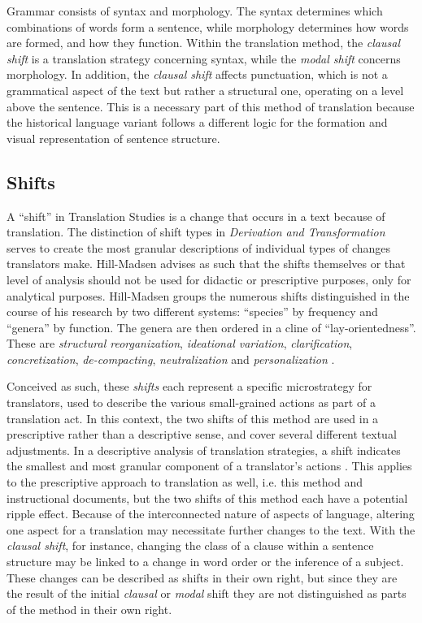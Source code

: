 \begin{paper}
Grammar consists of syntax and morphology. The syntax determines which
combinations of words form a sentence, while morphology determines how
words are formed, and how they function. Within the translation method,
the \emph{clausal shift} is a translation strategy concerning syntax,
while the \emph{modal shift} concerns morphology. In addition, the
\emph{clausal shift} affects punctuation, which is not a grammatical
aspect of the text but rather a structural one, operating on a level
above the sentence. This is a necessary part of this method of
translation because the historical language variant follows a different
logic for the formation and visual representation of sentence structure.

\subsection{Shifts}

A ``shift'' in Translation Studies is a change that occurs in a text
because of translation. The distinction of shift types in \emph{Derivation
and Transformation} serves to create the most granular descriptions of
individual types of changes translators make. Hill-Madsen advises as
such that the shifts themselves or that level of analysis should not be
used for didactic or prescriptive purposes, only for analytical
purposes. Hill-Madsen groups the numerous shifts distinguished in the
course of his research by two different systems: ``species'' by frequency
and ``genera'' by function. The genera are then ordered in a cline of
``lay-orientedness''. These are \emph{structural reorganization},
\emph{ideational variation}, \emph{clarification},
\emph{concretization}, \emph{de-compacting}, \emph{neutralization} and
\emph{personalization} \citep[262--69]{hill-madsen_derivation_2014}.

Conceived as such, these \emph{shifts} each represent a specific
microstrategy for translators, used to describe the various
small-grained actions as part of a translation act. In this context, the
two shifts of this method are used in a prescriptive rather than a
descriptive sense, and cover several different textual adjustments. In a
descriptive analysis of translation strategies, a shift indicates the
smallest and most granular component of a translator's actions \citep[3--12]{hill-madsen_derivation_2014}. This applies to the prescriptive approach to
translation as well, i.e. this method and instructional documents, but
the two shifts of this method each have a potential ripple effect.
Because of the interconnected nature of aspects of language, altering
one aspect for a translation may necessitate further changes to the
text. With the \emph{clausal shift}, for instance, changing the class of
a clause within a sentence structure may be linked to a change in word
order or the inference of a subject. These changes can be described as
shifts in their own right, but since they are the result of the initial
\emph{clausal} or \emph{modal} shift they are not distinguished as parts
of the method in their own right.


\end{paper}
